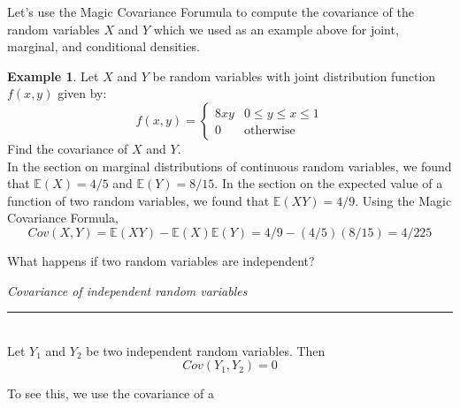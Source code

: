 \documentclass[12pt]{article}
\theoremstyle{definition}
\newtheorem*{example}{Example}
\theoremstyle{remark}
\def\E{{\mathbb E}}
\begin{document}
Let's use the Magic Covariance Forumula to compute the covariance of the random variables $X$ and $Y$ which we used as an example above for joint, marginal, and conditional densities.

\begin{example}
Let $X$ and $Y$ be random variables with joint distribution function $f(x, y)$ given by:
\[
f(x, y) = \begin{cases} 
      8 x y  & 0 \leq y \leq x \leq 1 \\
      0 & \textrm{otherwise}
   \end{cases}
\]
Find the covariance of $X$ and $Y$.\\

In the section on marginal distributions of continuous random variables, we found that $\E(X) = 4/5$ and $\E(Y) = 8/15$. In the section on the expected value of a function of two random variables, we found that $\E(XY) = 4/9$. Using the Magic Covariance Formula,
\[
Cov(X, Y) = \E(XY) - \E(X) \E(Y) = 4/9 - (4/5)(8/15) = 4/225
\]
\end{example}

What happens if two random variables are independent?

\begin{framed}
  \emph{Covariance of independent random variables}\\
  \rule{\dimexpr{}\fboxrule}{.1pt} \\
Let $Y_1$ and $Y_2$ be two independent random variables. Then
\[
Cov(Y_1, Y_2) = 0
\]
\end{framed}
To see this, we use the covariance of a 
\end{document}
